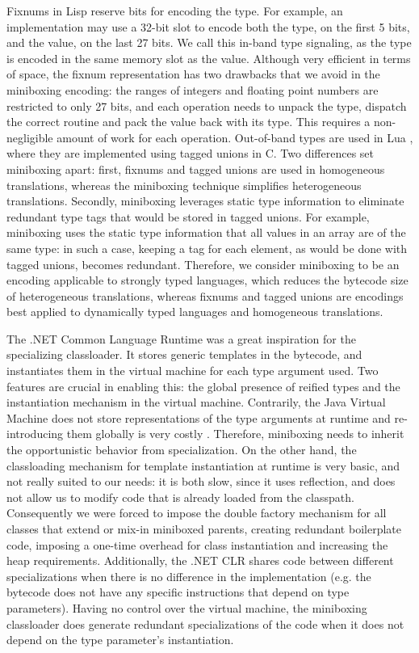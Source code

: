 Fixnums in Lisp \cite{fixnums-lisp} reserve bits for encoding the type. For example, an implementation may use a 32-bit slot to encode both the type, on the first 5 bits, and the value, on the last 27 bits. We call this in-band type signaling, as the type is encoded in the same memory slot as the value. Although very efficient in terms of space, the fixnum representation has two drawbacks that we avoid in the miniboxing encoding: the ranges of integers and floating point numbers are restricted to only 27 bits, and each operation needs to unpack the type, dispatch the correct routine and pack the value back with its type. This requires a non-negligible amount of work for each operation. Out-of-band types are used in Lua \cite{tagged-unions-lua}, where they are implemented using tagged unions in C. Two differences set miniboxing apart: first, fixnums and tagged unions are used in homogeneous translations, whereas the miniboxing technique simplifies heterogeneous translations. Secondly, miniboxing leverages static type information to eliminate redundant type tags that would be stored in tagged unions. For example, miniboxing uses the static type information that all values in an array are of the same type: in such a case, keeping a tag for each element, as would be done with tagged unions, becomes redundant. Therefore, we consider miniboxing to be an encoding applicable to strongly typed languages, which reduces the bytecode size of heterogeneous translations, whereas fixnums and tagged unions are encodings best applied to dynamically typed languages and homogeneous translations.

The .NET Common Language Runtime \cite{ecma-dotnet, dot-net-generics, dot-net-compiling} was a great inspiration for the specializing classloader. It stores generic templates in the bytecode, and instantiates them in the virtual machine for each type argument used. Two features are crucial in enabling this: the global presence of reified types and the instantiation mechanism in the virtual machine. Contrarily, the Java Virtual Machine does not store representations of the type arguments at runtime \cite{java-erasure} and re-introducing them globally is very costly \cite{michel-thesis}. Therefore, miniboxing needs to inherit the opportunistic behavior from specialization. On the other hand, the classloading mechanism for template instantiation at runtime is very basic, and not really suited to our needs: it is both slow, since it uses reflection, and does not allow us to modify code that is already loaded from the classpath. Consequently we were forced to impose the double factory mechanism for all classes that extend or mix-in miniboxed parents, creating redundant boilerplate code, imposing a one-time overhead for class instantiation and increasing the heap requirements. Additionally, the .NET CLR shares code between different specializations when there is no difference in the implementation (e.g. the bytecode does not have any specific instructions that depend on type parameters). Having no control over the virtual machine, the miniboxing classloader does generate redundant specializations of the code when it does not depend on the type parameter's instantiation.

